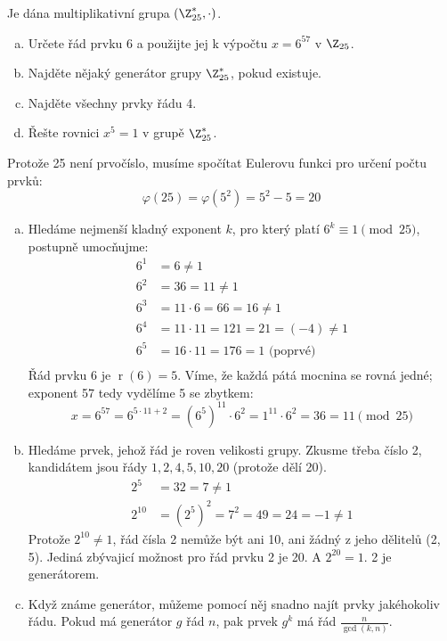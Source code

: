 \documentclass[11pt, a4paper]{article}
\DeclareMathOperator*{\ra}{r}
\begin{document}
\begin{exercise}
Je dána multiplikativní grupa $(\Z_{25}^*, \cdot)$.
\vspace{-1em}
\begin{enumerate}[a)]
	\item Určete řád prvku 6 a použijte jej k výpočtu $x = 6^{57}$ v $\Z_{25}$.
	\item Najděte nějaký generátor grupy $\Z_{25}^*$, pokud existuje.
	\item Najděte všechny prvky řádu 4.
	\item Řešte rovnici $x^5 = 1$ v grupě $\Z_{25}^*$.
\end{enumerate}
\end{exercise}
\begin{solution}
Protože 25 není prvočíslo, musíme spočítat Eulerovu funkci pro určení počtu prvků:
\begin{equation}
	\varphi(25) = \varphi\left(5^2\right) = 5^2 - 5 = 20 
\end{equation}
\begin{enumerate}[a)]
	\item Hledáme nejmenší kladný exponent $k$, pro který platí $6^k \equiv 1 \pmod{25}$, postupně umocňujme:
	\begin{align*}
		6^1 &= 6\not= 1 \\
		6^2 &= 36 = 11\not= 1 \\
		6^3 &= 11 \cdot 6 = 66 = 16\not= 1 \\
		6^4 &= 11 \cdot 11 = 121 = 21 = (-4)\not= 1 \\
		6^5 &= 16 \cdot 11 = 176 = 1 \text{ (poprvé)} \\
	\end{align*}
	Řád prvku 6 je $\ra(6) = 5$. Víme, že každá pátá mocnina se rovná jedné; exponent 57 tedy vydělíme 5 se zbytkem:
	\begin{equation}
		x = 6^{57} = 6^{5 \cdot 11 + 2} = \left(6^5\right)^11 \cdot 6^2 = 1^11 \cdot 6^2 = 36 = 11 \pmod{25} 
	\end{equation}
	\item Hledáme prvek, jehož řád je roven velikosti grupy. Zkusme třeba číslo 2, kandidátem jsou řády $1, 2, 4, 5, 10, 20$ (protože dělí 20).
	\begin{align*}
		2^5 &= 32 = 7 \not= 1 \\
		2^{10} &= \left(2^5\right)^2 = 7^2 = 49 = 24 = -1 \not=1
	\end{align*}
	Protože $2^{10} \not=1$, řád čísla 2 nemůže být ani 10, ani žádný z jeho dělitelů (2, 5). Jediná zbývajicí možnost pro řád prvku 2 je 20. A $2^{20} = 1$. 2 je generátorem.
	\item Když známe generátor, můžeme pomocí něj snadno najít prvky jakéhokoliv řádu. Pokud má generátor $g$ řád $n$, pak prvek $g^k$ má řád $\frac{n}{\gcd(k,n)}$.


\end{enumerate}
\end{solution}
\end{document}
